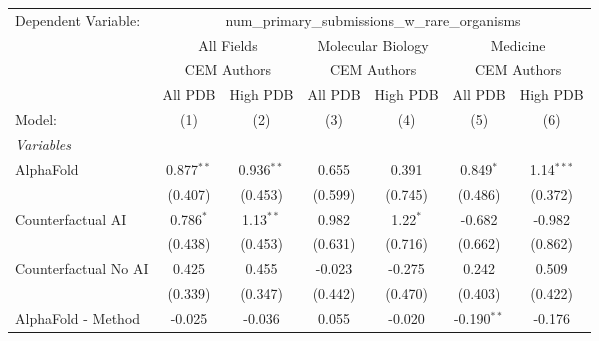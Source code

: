 \begingroup
\centering
\begin{tabular}{lcccccc}
   \tabularnewline \midrule \midrule
   Dependent Variable: & \multicolumn{6}{c}{num\_primary\_submissions\_w\_rare\_organisms}\\
 & \multicolumn{2}{c}{All Fields} & \multicolumn{2}{c}{Molecular Biology} & \multicolumn{2}{c}{Medicine} \\
\cmidrule(lr){2-3} \cmidrule(lr){4-5} \cmidrule(lr){6-7}
 & \multicolumn{2}{c}{CEM Authors} & \multicolumn{2}{c}{CEM Authors} & \multicolumn{2}{c}{CEM Authors} \\
\cmidrule(lr){2-3} \cmidrule(lr){4-5} \cmidrule(lr){6-7}
 & \multicolumn{1}{c}{All PDB} & \multicolumn{1}{c}{High PDB} & \multicolumn{1}{c}{All PDB} & \multicolumn{1}{c}{High PDB} & \multicolumn{1}{c}{All PDB} & \multicolumn{1}{c}{High PDB} \\
\cmidrule(lr){2-2} \cmidrule(lr){3-3} \cmidrule(lr){4-4} \cmidrule(lr){5-5} \cmidrule(lr){6-6} \cmidrule(lr){7-7}
   Model:                                                     & (1)           & (2)           & (3)           & (4)           & (5)           & (6)\\  
   \midrule
   \emph{Variables}\\
   AlphaFold                                                  & 0.877$^{**}$  & 0.936$^{**}$  & 0.655         & 0.391         & 0.849$^{*}$   & 1.14$^{***}$\\   
                                                              & (0.407)       & (0.453)       & (0.599)       & (0.745)       & (0.486)       & (0.372)\\   
   Counterfactual AI                                          & 0.786$^{*}$   & 1.13$^{**}$   & 0.982         & 1.22$^{*}$    & -0.682        & -0.982\\   
                                                              & (0.438)       & (0.453)       & (0.631)       & (0.716)       & (0.662)       & (0.862)\\   
   Counterfactual No AI                                       & 0.425         & 0.455         & -0.023        & -0.275        & 0.242         & 0.509\\   
                                                              & (0.339)       & (0.347)       & (0.442)       & (0.470)       & (0.403)       & (0.422)\\   
   AlphaFold - Method                                         & -0.025        & -0.036        & 0.055         & -0.020        & -0.190$^{**}$ & -0.176\\   

\end{tabular}
